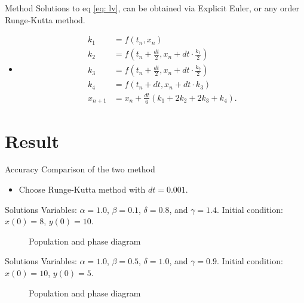 \documentclass{beamer}
\begin{document}
\begin{frame}{Method}
	Solutions to eq \ref{eq: lv}, can be obtained via Explicit Euler, or any order Runge-Kutta method.
	\begin{itemize}
		\item<2-> 
		\begin{align}
			k_1 &= f(t_n, x_n)\nonumber\\
			k_2 &= f\left(t_n + \frac{dt}{2}, x_n + dt\cdot\frac{k_1}{2}\right)\nonumber\\
			k_3 &= f\left(t_n + \frac{dt}{2}, x_n + dt\cdot\frac{k_2}{2}\right)\nonumber\\
			k_4 &= f\left(t_n + dt, x_n + dt\cdot k_3\right)\nonumber\\
			x_{n+1} &= x_n + \frac{dt}{6}\left(k_1 + 2k_2 + 2k_3 + k_4\right).\label{eq: runge kutta}
		\end{align}
	\end{itemize}
\end{frame}

\section{Result}
\begin{frame}{Accuracy}
	Comparison of the two method
	\begin{itemize}
		\item<2-> Choose Runge-Kutta method with $dt = 0.001$.
	\end{itemize}
\end{frame}

\begin{frame}{Solutions}
	Variables: $\alpha = 1.0$, $\beta = 0.1$, $\delta = 0.8$, and $\gamma = 1.4$.\newline
	Initial condition: $x(0) = 8$, $y(0) = 10$.
	\begin{figure}
		\centering

		\qquad
	
		\caption{Population and phase diagram}
		\label{fig:1}
	\end{figure}
\end{frame}

\begin{frame}{Solutions}
	Variables: $\alpha = 1.0$, $\beta = 0.5$, $\delta = 1.0$, and $\gamma = 0.9$.\newline
	Initial condition: $x(0) = 10$, $y(0) = 5$.
	\begin{figure}
		\centering

		\qquad
	
		\caption{Population and phase diagram}
		\label{fig:2}
	\end{figure}
\end{frame}
\end{document}

